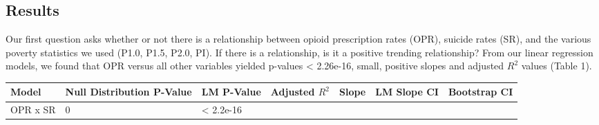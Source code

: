 \documentclass[
]{article}
\begin{document}
\hypertarget{results}{%
\subsection{Results}\label{results}}

Our first question asks whether or not there is a relationship between
opioid prescription rates (OPR), suicide rates (SR), and the various
poverty statistics we used (P1.0, P1.5, P2.0, PI). If there is a
relationship, is it a positive trending relationship? From our linear
regression models, we found that OPR versus all other variables yielded
p-values \textless{} 2.26e-16, small, positive slopes and adjusted
\(R^2\) values (Table 1).

\begin{longtable}[]{@{}lllllll@{}}
\toprule
\begin{minipage}[b]{0.12\columnwidth}\raggedright
Model\strut
\end{minipage} & \begin{minipage}[b]{0.12\columnwidth}\raggedright
Null Distribution P-Value\strut
\end{minipage} & \begin{minipage}[b]{0.12\columnwidth}\raggedright
LM P-Value\strut
\end{minipage} & \begin{minipage}[b]{0.12\columnwidth}\raggedright
Adjusted \(R^2\)\strut
\end{minipage} & \begin{minipage}[b]{0.12\columnwidth}\raggedright
Slope\strut
\end{minipage} & \begin{minipage}[b]{0.12\columnwidth}\raggedright
LM Slope CI\strut
\end{minipage} & \begin{minipage}[b]{0.12\columnwidth}\raggedright
Bootstrap CI\strut
\end{minipage}\tabularnewline
\midrule
\endhead
\begin{minipage}[t]{0.12\columnwidth}\raggedright
OPR x SR\strut
\end{minipage} & \begin{minipage}[t]{0.12\columnwidth}\raggedright
0\strut
\end{minipage} & \begin{minipage}[t]{0.12\columnwidth}\raggedright
\textless{} 2.2e-16\strut
\end{minipage} & \begin{minipage}[t]{0.12\columnwidth}\raggedright

\end{minipage}
\end{longtable}
\end{document}
